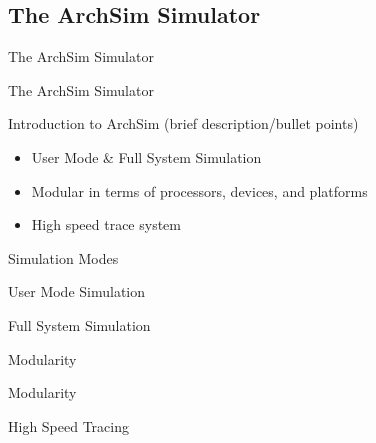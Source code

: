 \subsection{The ArchSim Simulator}

\begin{frame}{The ArchSim Simulator}

\end{frame}

\begin{frame}{The ArchSim Simulator}

Introduction to ArchSim (brief description/bullet points)

\begin{itemize}
	\item User Mode \& Full System Simulation
	\item Modular in terms of processors, devices, and platforms
	\item High speed trace system
\end{itemize}

\end{frame}

\begin{frame}{Simulation Modes}

User Mode Simulation

Full System Simulation

\end{frame}

\begin{frame}{Modularity}

Modularity

\end{frame}

\begin{frame}{High Speed Tracing}

\end{frame}
